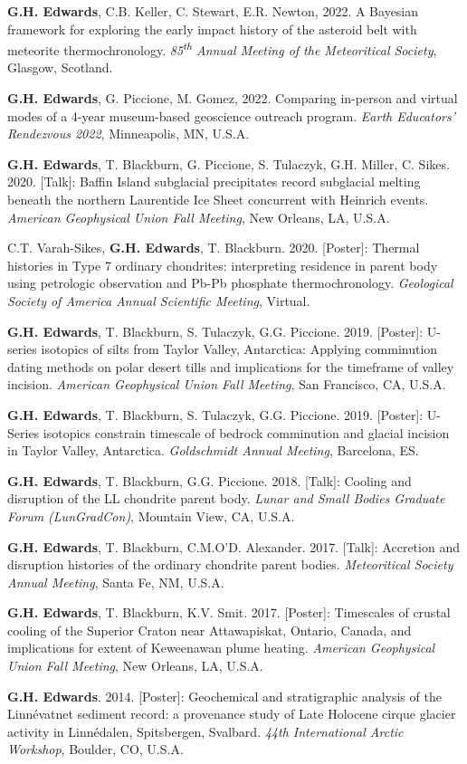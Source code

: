 \documentclass[10pt]{article}
\newcommand{\ghedwards}{\textbf{G.H. Edwards}}
\begin{document}
\begin{etaremune} [itemsep=4pt, leftmargin=3ex]
 \item \ghedwards, C.B. Keller, C. Stewart, E.R. Newton, 2022. A Bayesian framework for exploring the early impact history of the asteroid belt with meteorite thermochronology. \textit{85\textsuperscript{th} Annual Meeting of the Meteoritical Society}, Glasgow, Scotland. 
  \item \ghedwards, G. Piccione, M. Gomez, 2022. Comparing in-person and virtual modes of a 4-year museum-based geoscience outreach program. \textit{Earth Educators' Rendezvous 2022}, Minneapolis, MN, U.S.A.
  \item \ghedwards, T. Blackburn, G. Piccione, S. Tulaczyk, G.H. Miller, C. Sikes. 2020. [Talk]: Baffin Island subglacial precipitates record subglacial melting beneath the northern Laurentide Ice Sheet concurrent with Heinrich events. \textit{American Geophysical Union Fall Meeting}, New Orleans, LA, U.S.A.
  \item C.T. Varah-Sikes, \ghedwards, T. Blackburn. 2020. [Poster]: Thermal histories in Type 7 ordinary chondrites: interpreting residence in parent body using petrologic observation and Pb-Pb phosphate thermochronology. \textit{Geological Society of America Annual Scientific Meeting}, Virtual.
  \item \ghedwards, T. Blackburn, S. Tulaczyk, G.G. Piccione. 2019. [Poster]: U-series isotopics of silts from Taylor Valley, Antarctica: Applying comminution dating methods on polar desert tills and implications for the timeframe of valley incision. \textit{American Geophysical Union Fall Meeting}, San Francisco, CA, U.S.A.
  \item  \ghedwards, T. Blackburn, S. Tulaczyk, G.G. Piccione. 2019. [Poster]: U-Series isotopics constrain timescale of bedrock comminution and glacial incision in Taylor Valley, Antarctica. \textit{Goldschmidt Annual Meeting}, Barcelona, ES.
	\item  \ghedwards, T. Blackburn, G.G. Piccione. 2018. [Talk]: Cooling and disruption of the LL chondrite parent body. \textit{Lunar and Small Bodies Graduate Forum (LunGradCon)}, Mountain View, CA, U.S.A.
  \item  \ghedwards, T. Blackburn, C.M.O’D. Alexander. 2017. [Talk]: Accretion and disruption histories of the ordinary chondrite parent bodies. \textit{Meteoritical Society Annual Meeting}, Santa Fe, NM, U.S.A.
  \item \ghedwards, T. Blackburn, K.V. Smit. 2017. [Poster]: Timescales of crustal cooling of the Superior Craton near Attawapiskat, Ontario, Canada, and implications for extent of Keweenawan plume heating. \textit{American Geophysical Union Fall Meeting}, New Orleans, LA, U.S.A.
  \item \ghedwards. 2014. [Poster]: Geochemical and stratigraphic analysis of the Linnévatnet sediment record: a provenance study of Late Holocene cirque glacier activity in Linnédalen, Spitsbergen, Svalbard. \textit{44th International Arctic Workshop}, Boulder, CO, U.S.A.
\end{etaremune}
\vspace{-12pt}
\end{document}
